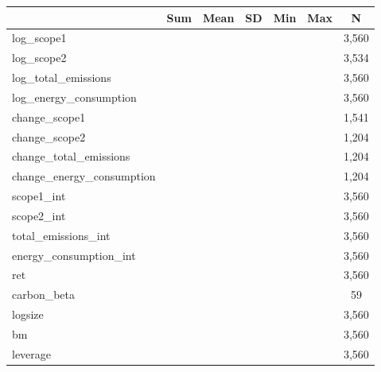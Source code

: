 {
\def\sym#1{\ifmmode^{#1}\else\(^{#1}\)\fi}
\begin{tabular}{l*{1}{cccccc}}
\toprule
                    &         Sum&        Mean&          SD&         Min&         Max&           N\\
\midrule
log\_scope1          &            &            &            &            &            &       3,560\\
log\_scope2          &            &            &            &            &            &       3,534\\
log\_total\_emissions &            &            &            &            &            &       3,560\\
log\_energy\_consumption&            &            &            &            &            &       3,560\\
change\_scope1       &            &            &            &            &            &       1,541\\
change\_scope2       &            &            &            &            &            &       1,204\\
change\_total\_emissions&            &            &            &            &            &       1,204\\
change\_energy\_consumption&            &            &            &            &            &       1,204\\
scope1\_int          &            &            &            &            &            &       3,560\\
scope2\_int          &            &            &            &            &            &       3,560\\
total\_emissions\_int &            &            &            &            &            &       3,560\\
energy\_consumption\_int&            &            &            &            &            &       3,560\\
ret                 &            &            &            &            &            &       3,560\\
carbon\_beta         &            &            &            &            &            &          59\\
logsize             &            &            &            &            &            &       3,560\\
bm                  &            &            &            &            &            &       3,560\\
leverage            &            &            &            &            &            &       3,560\\

\end{tabular}}
